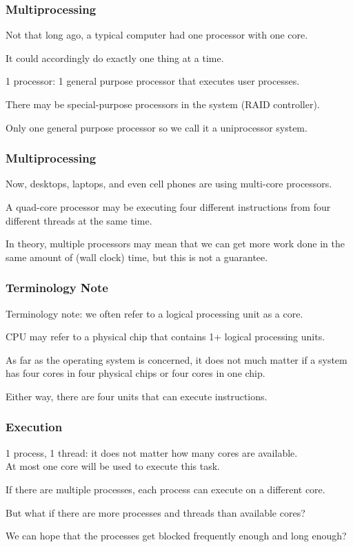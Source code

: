 \begin{frame}
	\frametitle{Multiprocessing}

	Not that long ago, a typical computer had one processor with one core.

	It could accordingly do exactly one thing at a time.

	1 processor: 1 general purpose processor that executes user processes.

	There may be special-purpose processors in the system (RAID controller).

	Only one general purpose processor so we call it a uniprocessor system.



\end{frame}


\begin{frame}
	\frametitle{Multiprocessing}

	Now, desktops, laptops, and even cell phones are using multi-core processors.

	A quad-core processor may be executing four different instructions from four different threads at the same time.

	In theory, multiple processors may mean that we can get more work done in the same amount of (wall clock) time, but this is not a guarantee.

\end{frame}


\begin{frame}
	\frametitle{Terminology Note}


	Terminology note: we often refer to a logical processing unit as a \alert{core}.

	CPU may refer to a physical chip that contains 1+ logical processing units.

	As far as the operating system is concerned, it does not much matter if a system has four cores in four physical chips or four cores in one chip.

	Either way, there are four units that can execute instructions.



\end{frame}


\begin{frame}
	\frametitle{Execution}

	1 process, 1 thread: it does not matter how many cores are available.\\
	\quad At most one core will be used to execute this task.

	If there are multiple processes, each process can execute on a different core.

	But what if there are more processes and threads than available cores?

	We can hope that the processes get blocked frequently enough and long enough?



\end{frame}


